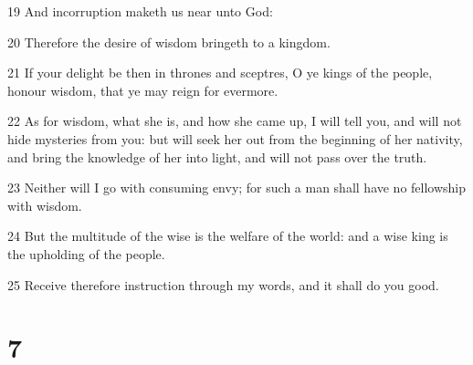 \par 19 And incorruption maketh us near unto God:
\par 20 Therefore the desire of wisdom bringeth to a kingdom.
\par 21 If your delight be then in thrones and sceptres, O ye kings of the people, honour wisdom, that ye may reign for evermore.
\par 22 As for wisdom, what she is, and how she came up, I will tell you, and will not hide mysteries from you: but will seek her out from the beginning of her nativity, and bring the knowledge of her into light, and will not pass over the truth.
\par 23 Neither will I go with consuming envy; for such a man shall have no fellowship with wisdom.
\par 24 But the multitude of the wise is the welfare of the world: and a wise king is the upholding of the people.
\par 25 Receive therefore instruction through my words, and it shall do you good.

\chapter{7}

